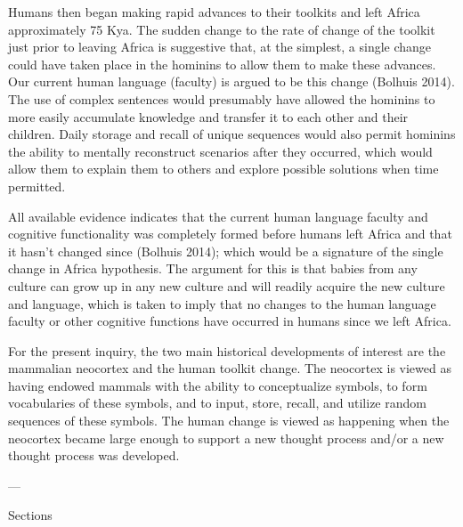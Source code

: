 \documentclass{clv3}
\begin{document}
Humans then began making rapid advances to their toolkits and left Africa approximately 75 Kya.   The sudden change to the rate of change of the toolkit just prior to leaving Africa is suggestive that, at the simplest, a single change could have taken place in the hominins to allow them to make  these advances.   Our current human language (faculty) is argued to be this change (Bolhuis 2014).  The use of complex sentences would presumably have allowed the hominins to more easily accumulate knowledge and transfer it to each other and their children.  Daily storage and recall of unique sequences would also permit hominins the ability to mentally reconstruct scenarios after they occurred, which would allow them to explain them to others and explore possible solutions when time permitted. 

All available evidence indicates that the current human language faculty and cognitive functionality was completely formed before humans left Africa and that it hasn’t changed since (Bolhuis 2014); which would be a signature of the single change in Africa hypothesis.  The argument for this is that babies from any culture can grow up in any new culture and will readily acquire the new culture and language, which is taken to imply that no changes to the human language faculty or other cognitive functions have occurred in humans since we left Africa. 

For the present inquiry, the two main historical developments of interest are the mammalian neocortex and the human toolkit change.  The neocortex is viewed as having endowed mammals with the ability to conceptualize symbols, to form vocabularies of these symbols, and to input, store, recall, and utilize  random sequences of these symbols.  The human change is viewed as happening when the neocortex became large enough to support a new thought process and/or a new thought process was developed.  

\vspace{1cm}
---

Sections
\end{document}
